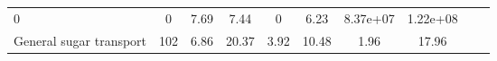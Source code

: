 \documentclass[]{article}
\begin{document}
\begin{longtable}[]{@{}lccccccccc@{}}
\begin{minipage}[t]{0.08\columnwidth}
0\strut
\end{minipage} & \begin{minipage}[t]{0.08\columnwidth}\centering\strut
0\strut
\end{minipage} & \begin{minipage}[t]{0.08\columnwidth}\centering\strut
7.69\strut
\end{minipage} & \begin{minipage}[t]{0.08\columnwidth}\centering\strut
7.44\strut
\end{minipage} & \begin{minipage}[t]{0.08\columnwidth}\centering\strut
0\strut
\end{minipage} & \begin{minipage}[t]{0.08\columnwidth}\centering\strut
6.23\strut
\end{minipage} & \begin{minipage}[t]{0.08\columnwidth}\centering\strut
8.37e+07\strut
\end{minipage} & \begin{minipage}[t]{0.08\columnwidth}\centering\strut
1.22e+08\strut
\end{minipage}\tabularnewline
\begin{minipage}[t]{0.07\columnwidth}\raggedright\strut
General sugar transport\strut
\end{minipage} & \begin{minipage}[t]{0.06\columnwidth}\centering\strut
102\strut
\end{minipage} & \begin{minipage}[t]{0.08\columnwidth}\centering\strut
6.86\strut
\end{minipage} & \begin{minipage}[t]{0.08\columnwidth}\centering\strut
20.37\strut
\end{minipage} & \begin{minipage}[t]{0.08\columnwidth}\centering\strut
3.92\strut
\end{minipage} & \begin{minipage}[t]{0.08\columnwidth}\centering\strut
10.48\strut
\end{minipage} & \begin{minipage}[t]{0.08\columnwidth}\centering\strut
1.96\strut
\end{minipage} & \begin{minipage}[t]{0.08\columnwidth}\centering\strut
17.96\strut
\end{minipage} & \begin{minipage}[t]{0.08\columnwidth}\centering\strut

\end{minipage}
\end{longtable}
\end{document}

